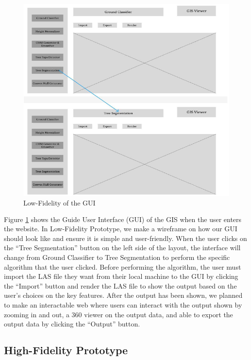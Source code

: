 \documentclass[a4paper, 12pt]{article}
\begin{document}
\begin{figure}[H]
    \centering
    \includegraphics[width=\textwidth]{Images/02.png}
    \caption{Low-Fidelity of the GUI}
    \label{fig:1}
\end{figure}


Figure \ref{fig:1} shows the Guide User Interface (GUI) of the GIS when the user enters the website. In Low-Fidelity Prototype, we make a wireframe on how our GUI should look like and ensure it is simple and user-friendly. When the user clicks on the “Tree Segmentation” button on the left side of the layout, the interface will change from Ground Classifier to Tree Segmentation to perform the specific algorithm that the user clicked. Before performing the algorithm, the user must import the LAS file they want from their local machine to the GUI by clicking the “Import” button and render the LAS file to show the output based on the user's choices on the key features. After the output has been shown, we planned to make an interactable web where users can interact with the output shown by zooming in and out, a 360 viewer on the output data, and able to export the output data by clicking the “Output” button.

\subsection{High-Fidelity Prototype}
\end{document}
